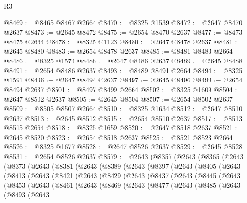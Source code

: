 \begin{lexlean}{R3}
\begin{coremodule}
@8469 := @8465 @8467 @2664
@8470 := @8325 @1539
@8472 := @2647 @8470 @2637
@8473 := @2645 @8472
@8475 := @2654 @8470 @2637
@8477 := @8473 @8475 @2664
@8478 := @8325 @1123
@8480 := @2647 @8478 @2637
@8481 := @2645 @8480
@8483 := @2654 @8478 @2637
@8485 := @8481 @8483 @2664
@8486 := @8325 @1574
@8488 := @2647 @8486 @2637
@8489 := @2645 @8488
@8491 := @2654 @8486 @2637
@8493 := @8489 @8491 @2664
@8494 := @8325 @1591
@8496 := @2647 @8494 @2637
@8497 := @2645 @8496
@8499 := @2654 @8494 @2637
@8501 := @8497 @8499 @2664
@8502 := @8325 @1609
@8504 := @2647 @8502 @2637
@8505 := @2645 @8504
@8507 := @2654 @8502 @2637
@8509 := @8505 @8507 @2664
@8510 := @8325 @1634
@8512 := @2647 @8510 @2637
@8513 := @2645 @8512
@8515 := @2654 @8510 @2637
@8517 := @8513 @8515 @2664
@8518 := @8325 @1659
@8520 := @2647 @8518 @2637
@8521 := @2645 @8520
@8523 := @2654 @8518 @2637
@8525 := @8521 @8523 @2664
@8526 := @8325 @1677
@8528 := @2647 @8526 @2637
@8529 := @2645 @8528
@8531 := @2654 @8526 @2637
@8579 := @2643
    (@8357
      (@2643
        (@8365
          (@2643
            (@8373
              (@2643
                (@8381
                  (@2643
                    (@8389
                      (@2643
                        (@8397
                          (@2643
                            (@8405
                              (@2643
                                (@8413
                                  (@2643
                                    (@8421
                                      (@2643
                                        (@8429
                                          (@2643
                                            (@8437
                                              (@2643
                                                (@8445
                                                  (@2643
                                                    (@8453
                                                      (@2643
                                                        (@8461
                                                          (@2643
                                                            (@8469
                                                              (@2643
                                                                (@8477
                                                                  (@2643
                                                                    (@8485
                                                                      (@2643
                                                                        (@8493
                                                                          (@2643

\end{coremodule}
\end{lexlean}
